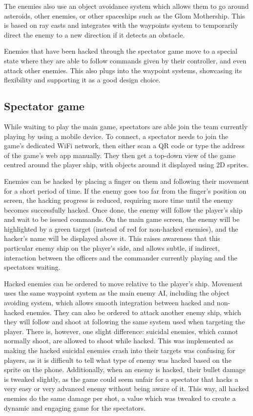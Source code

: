 \documentclass[a4paper,11pt]{article}
\begin{document}
The enemies also use an object avoidance system which allows them to go around asteroids, other enemies, or other spaceships such as the Glom Mothership. This is based on ray casts and integrates with the waypoints system to temporarily direct the enemy to a new direction if it detects an obstacle.

Enemies that have been hacked through the spectator game move to a special state where they are able to follow commands given by their controller, and even attack other enemies. This also plugs into the waypoint systems, showcasing its flexibility and supporting it as a good design choice.

\subsection{Spectator game}
While waiting to play the main game, spectators are able join the team currently playing by using a mobile device. To connect, a spectator needs to join the game’s dedicated WiFi network, then either scan a QR code or type the address of the game’s web app manually. They then get a top-down view of the game centred around the player ship, with objects around it displayed using 2D sprites.

Enemies can be hacked by placing a finger on them and following their movement for a short period of time. If the enemy goes too far from the finger’s position on screen, the hacking progress is reduced, requiring more time until the enemy becomes successfully hacked. Once done, the enemy will follow the player’s ship and wait to be issued commands. On the main game screen, the enemy will be highlighted by a green target (instead of red for non-hacked enemies), and the hacker’s name will be displayed above it. This raises awareness that this particular enemy ship on the player’s side, and allows subtle, if indirect, interaction between the officers and the commander currently playing and the spectators waiting.

Hacked enemies can be ordered to move relative to the player’s ship. Movement uses the same waypoint system as the main enemy AI, including the object avoiding system, which allows smooth integration between hacked and non-hacked enemies. They can also be ordered to attack another enemy ship, which they will follow and shoot at following the same system used when targeting the player. There is, however, one slight difference: suicidal enemies, which cannot normally shoot, are allowed to shoot while hacked. This was implemented as making the hacked suicidal enemies crash into their targets was confusing for players, as it is difficult to tell what type of enemy was hacked based on the sprite on the phone. Additionally, when an enemy is hacked, their bullet damage is tweaked slightly, as the game could seem unfair for a spectator that hacks a very easy or very advanced enemy without being aware of it. This way, all hacked enemies do the same damage per shot, a value which was tweaked to create a dynamic and engaging game for the spectators.
\end{document}
